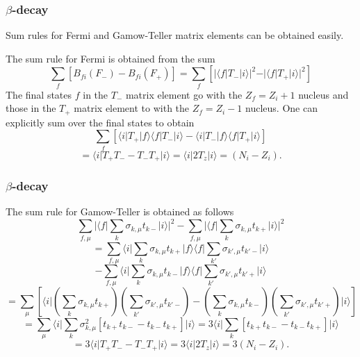 \documentclass{beamer}
\begin{document}
\begin{frame}
\frametitle{$\beta$-decay}

\begin{block}{}
Sum rules for Fermi and Gamow-Teller matrix elements can be obtained easily.

The sum rule for Fermi is obtained from the sum
\[
\sum _{f} \left[ B_{fi}(F_{-}) - B_{fi}(F_{+}) \right]
=\sum _{f} \left[ \vert \langle f\vert  T_{-} \vert i\rangle\vert ^{2} -  \vert \langle f\vert  T_{+} \vert 
i\rangle\vert ^{2} \right]
\]
The final states $f$ in the $T_{-}$ matrix element go
with the $Z_{f}=Z_{i}+1$ nucleus and those in the $T_{+}$ matrix element
to with the $Z_{f}=Z_{i}-1$ nucleus. One can explicitly sum over the
final states to obtain
\[
\sum _{f} \left[ \langle i\vert  T_{+} \vert f\rangle \langle f\vert T_{-}\vert i\rangle -  \langle i\vert  T_{-} \vert f\rangle \langle f\vert T_{+}\vert i\rangle \right]
\]
\[
= \langle i\vert  T_{+} T_{-} -  T_{-} T_{+}\vert i\rangle =\langle i\vert  2T_{z}\vert i\rangle  = (N_{i}-Z_{i}).       
\]
\end{block}
\end{frame}

\begin{frame}
\frametitle{$\beta$-decay}

\begin{block}{}
The sum rule for Gamow-Teller is obtained as follows
\[
\sum_{f,\mu}  \vert \langle f\vert  \sum_{k} \sigma_{k,\mu} t_{k-} \vert i\rangle\vert^{2}
- \sum_{f,\mu} \vert \langle f\vert  \sum_{k} \sigma_{k,\mu } t_{k+} \vert i\rangle\vert^{2}
\]
\[
= \sum_{f,\mu}\langle i\vert  \sum_{k} \sigma_{k,\mu} t_{k+} \vert f\rangle\langle f\vert  \sum_{k'} 
\sigma_{k',\mu} t_{k'-} \vert i\rangle
\]
\[
-  \sum_{f,\mu}
\langle i\vert  \sum_{k} \sigma_{k,\mu } t_{k-} \vert f\rangle\langle f\vert\sum_{k'} 
\sigma_{k',\mu } t_{k'+} \vert i\rangle
\]
\[
= \sum_{\mu} \left[\langle i\vert  \left(\sum _{k} \sigma_{k,\mu} t_{k+} \right)
    \left( \sum_{k'} \sigma_{k',\mu} t_{k'-}\right)
-   \left( \sum_{k} \sigma_{k,\mu} t_{k-} \right)
\left( \sum_{k'} \sigma_{k',\mu} t_{k'+} \right) \vert i\rangle
\right]
\]
\[
= \sum_{\mu }
\langle i\vert  \sum_{k}  \sigma ^{2}_{k,\mu } \left[ t_{k+} t_{k-} - t_{k-} t_{k+} \right] 
\vert i\rangle
= 3
\langle i\vert  \sum_{k} \left[ t_{k+} t_{k-} - t_{k-} t_{k+} \right] \vert i\rangle
\]
\[
=   3\langle i\vert  T_{+} T_{-} -  T_{-} T_{+}\vert i\rangle= 3\langle i\vert  2T_{z}\vert i\rangle  = 3(N_{i}-Z_{i}). 
\]
\end{block}
\end{frame}
\end{document}
